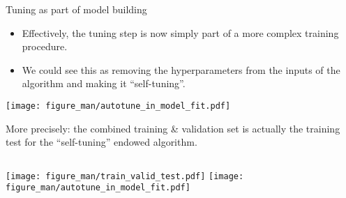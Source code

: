 \documentclass[11pt,compress,t,notes=noshow, xcolor=table]{beamer}
\begin{document}
\begin{vbframe}{Tuning as part of model building}
\begin{itemize}
\item Effectively, the tuning step is now simply part of a more complex training procedure.
\item We could see this as removing the hyperparameters from the inputs of the algorithm and making it \enquote{self-tuning}.
\end{itemize}
\begin{center}
\texttt{[image: figure\_man/autotune\_in\_model\_fit.pdf]}
\end{center}


\framebreak

More precisely: the combined training \& validation set is actually the training test for the \enquote{self-tuning} endowed algorithm. 

\vspace{1cm}
\begin{columns}[c, onlytextwidth]
\hspace*{-0.3cm}
\texttt{[image: figure\_man/train\_valid\_test.pdf]}
\hspace*{-0.7cm}
\texttt{[image: figure\_man/autotune\_in\_model\_fit.pdf]}
\end{columns}
\end{vbframe}

\endlecture
\end{document}
